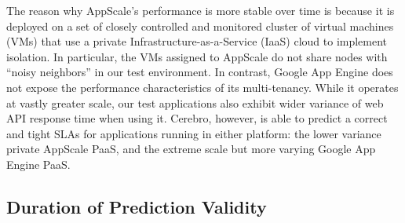 The reason why AppScale's performance is more stable over time is because it is
deployed on a set of closely controlled 
and monitored cluster of virtual machines (VMs) that use a private
Infrastructure-as-a-Service (IaaS) cloud to implement isolation.  In particular, the 
VMs assigned to AppScale do not share nodes with ``noisy neighbors'' in our
test environment.  In contrast, Google App Engine does not expose the
performance characteristics of its multi-tenancy.  While it operates at vastly
greater scale, our test applications also exhibit wider variance of web API
response time when using it.
Cerebro, however, is able to predict a correct and tight SLAs for applications
running in either platform: the lower variance private
AppScale PaaS, and the extreme scale but more varying Google App Engine PaaS.

\subsection{Duration of Prediction Validity}

%

